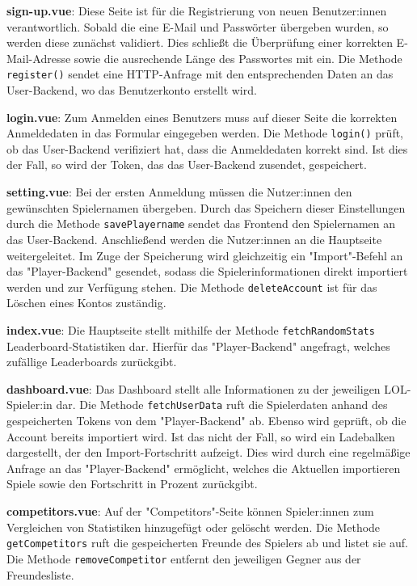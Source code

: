 \textbf{sign-up.vue}: Diese Seite ist für die Registrierung von neuen Benutzer:innen verantwortlich. Sobald die eine E-Mail und Passwörter übergeben wurden, so werden diese zunächst
validiert. Dies schließt die Überprüfung einer korrekten E-Mail-Adresse sowie die ausrechende Länge des Passwortes mit ein. Die Methode \verb|register()| sendet eine HTTP-Anfrage mit den 
entsprechenden Daten an das User-Backend, wo das Benutzerkonto erstellt wird.
\newline

\textbf{login.vue}: Zum Anmelden eines Benutzers muss auf dieser Seite die korrekten Anmeldedaten in das Formular eingegeben werden. Die Methode \verb|login()| prüft, ob das User-Backend
verifiziert hat, dass die Anmeldedaten korrekt sind. Ist dies der Fall, so wird der Token, das das User-Backend zusendet, gespeichert. 
\newline

\textbf{setting.vue}: Bei der ersten Anmeldung müssen die Nutzer:innen den gewünschten Spielernamen übergeben. Durch das Speichern dieser Einstellungen durch die Methode \verb|savePlayername|
sendet das Frontend den Spielernamen an das User-Backend. Anschließend werden die Nutzer:innen an die Hauptseite weitergeleitet. Im Zuge der Speicherung wird gleichzeitig ein "Import"-Befehl
an das "Player-Backend" gesendet, sodass die Spielerinformationen direkt importiert werden und zur Verfügung stehen. Die Methode \verb|deleteAccount| ist für das Löschen eines Kontos zuständig.
\newline

\textbf{index.vue}: Die Hauptseite stellt mithilfe der Methode \verb|fetchRandomStats| Leaderboard-Statistiken dar. Hierfür das "Player-Backend" angefragt, welches zufällige 
Leaderboards zurückgibt.
\newline

\textbf{dashboard.vue}: Das Dashboard stellt alle Informationen zu der jeweiligen LOL-Spieler:in dar. Die Methode \verb|fetchUserData| ruft die Spielerdaten anhand des gespeicherten Tokens
von dem "Player-Backend" ab. Ebenso wird geprüft, ob die Account bereits importiert wird. Ist das nicht der Fall, so wird ein Ladebalken dargestellt, der den Import-Fortschritt aufzeigt. Dies
wird durch eine regelmäßige Anfrage an das "Player-Backend" ermöglicht, welches die Aktuellen importieren Spiele sowie den Fortschritt in Prozent zurückgibt.
\newline

\textbf{competitors.vue}: Auf der "Competitors"-Seite können Spieler:innen zum Vergleichen von Statistiken hinzugefügt oder gelöscht werden. Die Methode \verb|getCompetitors| ruft die gespeicherten
Freunde des Spielers ab und listet sie auf. Die Methode \verb|removeCompetitor| entfernt den jeweiligen Gegner aus der Freundesliste.
\newline

